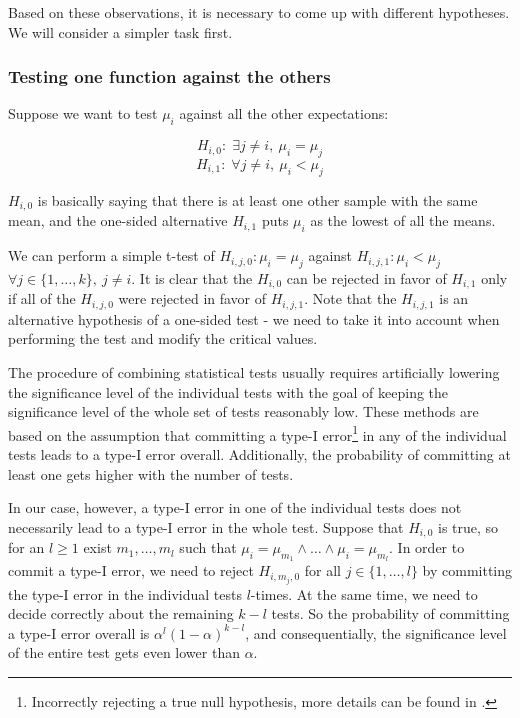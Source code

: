 Based on these observations, it is necessary to come up with different hypotheses. We will consider a simpler task first.

\subsubsection{Testing one function against the others}

Suppose we want to test $\mu_i$ against all the other expectations:

\[
H_{i,0}: \; \exists j \neq i, \ \mu_i = \mu_j
\]
\[
H_{i,1}: \; \forall j \neq i, \ \mu_i < \mu_j
\]

$H_{i,0}$ is basically saying that there is at least one other sample with the same mean, and the one-sided alternative $H_{i,1}$ puts $\mu_i$ as the lowest of all the means.

We can perform a simple t-test of $H_{i,j,0}: \mu_i = \mu_j$ against $H_{i,j,1}: \mu_i < \mu_j$ $\forall j \in \{1, \dots, k\}, \ j \neq i$. It is clear that the $H_{i,0}$ can be rejected in favor of $H_{i,1}$ only if all of the $H_{i,j,0}$ were rejected in favor of $H_{i,j,1}$. Note that the $H_{i,j,1}$ is an alternative hypothesis of a one-sided test - we need to take it into account when performing the test and modify the critical values.

The procedure of combining statistical tests usually requires artificially lowering the significance level of the individual tests with the goal of keeping the significance level of the whole set of tests reasonably low. These methods are based on the assumption that committing a type-I error\footnote{Incorrectly rejecting a true null hypothesis, more details can be found in \cite{weiss_introductory_2010}.} in any of the individual tests leads to a type-I error overall. Additionally, the probability of committing at least one gets higher with the number of tests.

In our case, however, a type-I error in one of the individual tests does not necessarily lead to a type-I error in the whole test. Suppose that $H_{i,0}$ is true, so for an $l \geq 1$ exist $m_1,\dots,m_l$ such that $\mu_i = \mu_{m_1} \wedge \dots \wedge \mu_i = \mu_{m_l}$. In order to commit a type-I error, we need to reject $H_{i,m_j,0}$ for all $j \in \{1, \dots, l\}$ by committing the type-I error in the individual tests $l$-times. At the same time, we need to decide correctly about the remaining $k-l$ tests. So the probability of committing a type-I error overall is $\alpha^l(1-\alpha)^{k-l}$, and consequentially, the significance level of the entire test gets even lower than $\alpha$.

